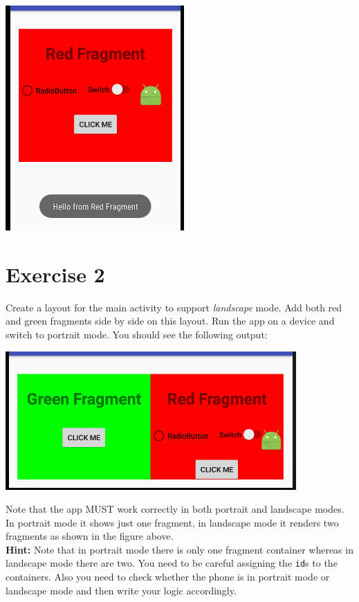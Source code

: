 \begin{center}
	\includegraphics[scale=\FigureScale]{chapters/ch11/images/19}
\end{center}
	
\section{Exercise 2}
\label{FRAG:exercise2}
Create a layout for the main activity to support \textit{landscape} mode. Add both red and green fragments side by side on this layout. Run the app on a device and switch to portrait mode. You should see the following output:

\begin{center}
	\includegraphics[scale=\FigureScale]{chapters/ch11/images/20}
\end{center}

Note that the app MUST work correctly in both portrait and landscape modes. In portrait mode it shows just one fragment, in landscape mode it renders two fragments as shown in the figure above. \\

\textbf{Hint:} Note that in portrait mode there is only one fragment container whereas in landscape mode there are two. You need to be careful assigning the \texttt{id}s to the containers. Also you need to check whether the phone is in portrait mode or landscape mode and then write your logic accordingly.

